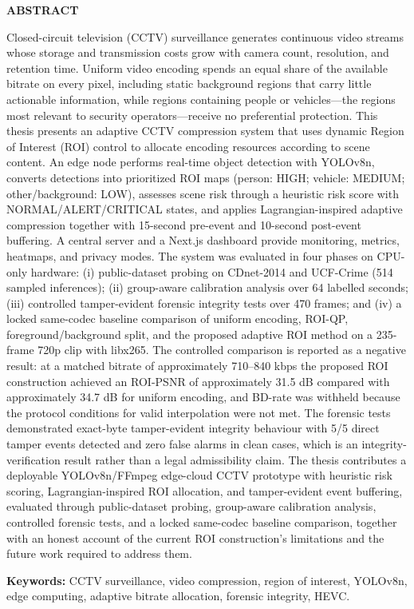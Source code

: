 \clearpage
\thispagestyle{plain}


\begin{center}
    \textbf{\Large ABSTRACT}
\end{center}

\vspace{0.5cm}

Closed-circuit television (CCTV) surveillance generates continuous video streams whose storage and transmission costs grow with camera count, resolution, and retention time. Uniform video encoding spends an equal share of the available bitrate on every pixel, including static background regions that carry little actionable information, while regions containing people or vehicles---the regions most relevant to security operators---receive no preferential protection. This thesis presents an adaptive CCTV compression system that uses dynamic Region of Interest (ROI) control to allocate encoding resources according to scene content. An edge node performs real-time object detection with YOLOv8n, converts detections into prioritized ROI maps (person: HIGH; vehicle: MEDIUM; other/background: LOW), assesses scene risk through a heuristic risk score with NORMAL/ALERT/CRITICAL states, and applies Lagrangian-inspired adaptive compression together with 15-second pre-event and 10-second post-event buffering. A central server and a Next.js dashboard provide monitoring, metrics, heatmaps, and privacy modes. The system was evaluated in four phases on CPU-only hardware: (i) public-dataset probing on CDnet-2014 and UCF-Crime (514 sampled inferences); (ii) group-aware calibration analysis over 64 labelled seconds; (iii) controlled tamper-evident forensic integrity tests over 470 frames; and (iv) a locked same-codec baseline comparison of uniform encoding, ROI-QP, foreground/background split, and the proposed adaptive ROI method on a 235-frame 720p clip with libx265. The controlled comparison is reported as a negative result: at a matched bitrate of approximately 710--840 kbps the proposed ROI construction achieved an ROI-PSNR of approximately 31.5 dB compared with approximately 34.7 dB for uniform encoding, and BD-rate was withheld because the protocol conditions for valid interpolation were not met. The forensic tests demonstrated exact-byte tamper-evident integrity behaviour with 5/5 direct tamper events detected and zero false alarms in clean cases, which is an integrity-verification result rather than a legal admissibility claim. The thesis contributes a deployable YOLOv8n/FFmpeg edge-cloud CCTV prototype with heuristic risk scoring, Lagrangian-inspired ROI allocation, and tamper-evident event buffering, evaluated through public-dataset probing, group-aware calibration analysis, controlled forensic tests, and a locked same-codec baseline comparison, together with an honest account of the current ROI construction's limitations and the future work required to address them.

\vspace{0.5cm}
\noindent\textbf{Keywords:} CCTV surveillance, video compression, region of interest, YOLOv8n, edge computing, adaptive bitrate allocation, forensic integrity, HEVC.

